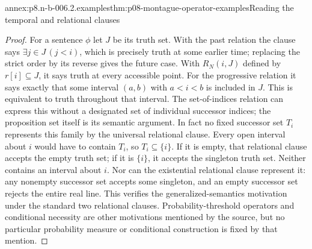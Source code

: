 \begin{annexitem}{annex:p8.n-b-006.2.examples}{thm:p08-montague-operator-examples}{Reading the temporal and relational clauses}
\begin{proof}
For a sentence \(\phi\) let \(J\) be its truth set. With the past
relation the clause says \(\exists j\in J\,(j<i)\), which is
precisely truth at some earlier time; replacing the strict order by its
reverse gives the future case. With \(R_N(i,J)\) defined by
\(r[i]\subseteq J\), it says truth at every accessible point.
For the progressive relation it says exactly that some interval
\((a,b)\) with \(a<i<b\) is included in \(J\). This is equivalent
to truth throughout that interval. The set-of-indices relation can
express this without a designated set of individual successor indices;
the proposition set itself is its semantic argument. In fact no fixed
successor set \(T_i\) represents this family by the universal relational
clause. Every open interval about \(i\) would have to contain
\(T_i\), so \(T_i\subseteq\{i\}\). If it is empty, that relational
clause accepts the empty truth set; if it is \(\{i\}\), it accepts
the singleton truth set. Neither contains an interval about \(i\).
Nor can the existential relational clause represent it: any nonempty
successor set accepts some singleton, and an empty successor set rejects
the entire real line. This verifies the generalized-semantics motivation
under the standard two relational clauses. Probability-threshold
operators and conditional necessity are other motivations mentioned by
the source, but no particular probability measure or conditional
construction is fixed by that mention.
\end{proof}
\end{annexitem}

